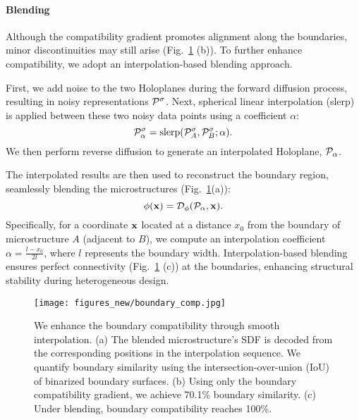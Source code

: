 \paragraph{Blending}
Although the compatibility gradient promotes alignment along the boundaries, minor discontinuities may still arise (Fig.~\ref{fig:blending} (b)). 
To further enhance compatibility, we adopt an interpolation-based blending approach.

First, we add noise to the two Holoplanes during the forward diffusion process, resulting in noisy representations $\mathcal{P}^{\sigma}$.
Next, spherical linear interpolation (slerp) is applied between these two noisy data points using a coefficient $\alpha$:
\begin{equation}
    \mathcal{P}_\alpha^{\sigma}=\text{slerp}(\mathcal{P}^{\sigma}_A, \mathcal{P}^{\sigma}_B; \alpha).
\end{equation}
We then perform reverse diffusion to generate an interpolated Holoplane, $\mathcal{P}_{\alpha}$.

The interpolated results are then used to reconstruct the boundary region, seamlessly blending the microstructures (Fig.~\ref{fig:blending}(a)):
\begin{equation}
    \phi(\mathbf{x}) = \mathcal{D}_{\phi}(\mathcal{P}_{\alpha}, \mathbf{x}).
\end{equation}
Specifically, for a coordinate $\mathbf{x}$ located at a distance $x_0$ from the boundary of microstructure $A$ (adjacent to $B$), we compute an interpolation coefficient $\alpha = \frac{l - x_0}{2l}$, where $l$ represents the boundary width.
Interpolation-based blending ensures perfect connectivity (Fig.~\ref{fig:blending} (c)) at the boundaries, enhancing structural stability during heterogeneous design.

\begin{figure}[tb]
    \texttt{[image: figures\_new/boundary\_comp.jpg]}
    \caption{We enhance the boundary compatibility through smooth interpolation. (a) The blended microstructure’s SDF is decoded from the corresponding positions in the interpolation sequence.
    We quantify boundary similarity using the intersection-over-union (IoU) of binarized boundary surfaces.
    (b) Using only the boundary compatibility gradient, we achieve 70.1\% boundary similarity.
    (c) Under blending, boundary compatibility reaches 100\%.}
	\label{fig:blending}
\end{figure}

